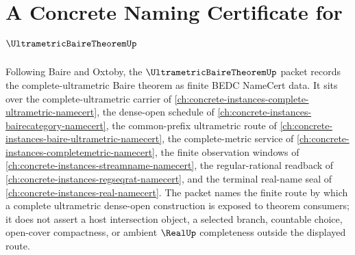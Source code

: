 \chapter{A Concrete Naming Certificate for $\UltrametricBaireTheoremUp$}
\label{ch:concrete-instances-ultrametric-baire-theorem-namecert}

Following Baire and Oxtoby, the $\UltrametricBaireTheoremUp$ packet records the complete-ultrametric Baire theorem as finite BEDC NameCert data. It sits over the complete-ultrametric carrier of \autoref{ch:concrete-instances-complete-ultrametric-namecert}, the dense-open schedule of \autoref{ch:concrete-instances-bairecategory-namecert}, the common-prefix ultrametric route of \autoref{ch:concrete-instances-baire-ultrametric-namecert}, the complete-metric service of \autoref{ch:concrete-instances-completemetric-namecert}, the finite observation windows of \autoref{ch:concrete-instances-streamname-namecert}, the regular-rational readback of \autoref{ch:concrete-instances-regseqrat-namecert}, and the terminal real-name seal of \autoref{ch:concrete-instances-real-namecert}. The packet names the finite route by which a complete ultrametric dense-open construction is exposed to theorem consumers; it does not assert a host intersection object, a selected branch, countable choice, open-cover compactness, or ambient $\RealUp$ completeness outside the displayed route.

